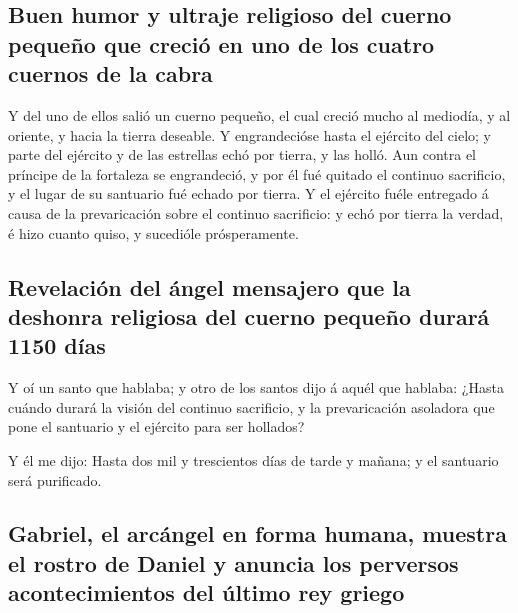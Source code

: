 \hypertarget{buen-humor-y-ultraje-religioso-del-cuerno-pequeuxf1o-que-creciuxf3-en-uno-de-los-cuatro-cuernos-de-la-cabra}{%
\subsection{Buen humor y ultraje religioso del cuerno pequeño que creció
en uno de los cuatro cuernos de la
cabra}\label{buen-humor-y-ultraje-religioso-del-cuerno-pequeuxf1o-que-creciuxf3-en-uno-de-los-cuatro-cuernos-de-la-cabra}}

 Y del uno de ellos salió un cuerno pequeño, el cual creció
mucho al mediodía, y al oriente, y hacia la tierra deseable.
 Y engrandecióse hasta el ejército del cielo; y parte del
ejército y de las estrellas echó por tierra, y las holló. 
Aun contra el príncipe de la fortaleza se engrandeció, y por él fué
quitado el continuo sacrificio, y el lugar de su santuario fué echado
por tierra.  Y el ejército fuéle entregado á causa de la
prevaricación sobre el continuo sacrificio: y echó por tierra la verdad,
é hizo cuanto quiso, y sucedióle prósperamente.

\hypertarget{revelaciuxf3n-del-uxe1ngel-mensajero-que-la-deshonra-religiosa-del-cuerno-pequeuxf1o-duraruxe1-1150-duxedas}{%
\subsection{Revelación del ángel mensajero que la deshonra religiosa del
cuerno pequeño durará 1150
días}\label{revelaciuxf3n-del-uxe1ngel-mensajero-que-la-deshonra-religiosa-del-cuerno-pequeuxf1o-duraruxe1-1150-duxedas}}

 Y oí un santo que hablaba; y otro de los santos dijo á
aquél que hablaba: ¿Hasta cuándo durará la visión del continuo
sacrificio, y la prevaricación asoladora que pone el santuario y el
ejército para ser hollados?

 Y él me dijo: Hasta dos mil y trescientos días de tarde y
mañana; y el santuario será purificado.

\hypertarget{gabriel-el-arcuxe1ngel-en-forma-humana-muestra-el-rostro-de-daniel-y-anuncia-los-perversos-acontecimientos-del-uxfaltimo-rey-griego}{%
\subsection{Gabriel, el arcángel en forma humana, muestra el rostro de
Daniel y anuncia los perversos acontecimientos del último rey
griego}\label{gabriel-el-arcuxe1ngel-en-forma-humana-muestra-el-rostro-de-daniel-y-anuncia-los-perversos-acontecimientos-del-uxfaltimo-rey-griego}}

